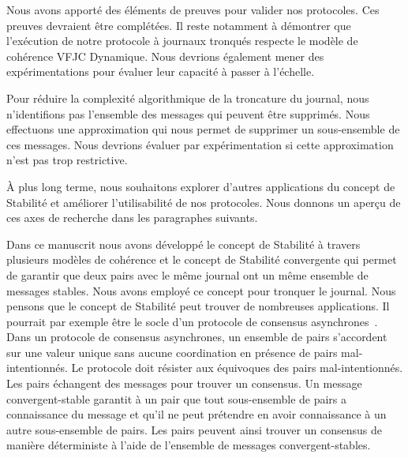 
Nous avons apporté des éléments de preuves pour valider nos protocoles.
Ces preuves devraient être complétées.
Il reste notamment à démontrer que l'exécution de notre protocole à journaux tronqués respecte le modèle de cohérence \acl{VFJC} Dynamique.
Nous devrions également mener des expérimentations pour évaluer leur capacité à passer à l'échelle.

Pour réduire la complexité algorithmique de la troncature du journal, nous n'identifions pas l'ensemble des messages qui peuvent être supprimés.
Nous effectuons une approximation qui nous permet de supprimer un sous-ensemble de ces messages.
Nous devrions évaluer par expérimentation si cette approximation n'est pas trop restrictive.

À plus long terme, nous souhaitons explorer d'autres applications du concept de Stabilité et améliorer l'utilisabilité de nos protocoles.
Nous donnons un aperçu de ces axes de recherche dans les paragraphes suivants.

Dans ce manuscrit nous avons développé le concept de Stabilité à travers plusieurs modèles de cohérence et le concept de Stabilité convergente qui permet de garantir que deux pairs avec le même journal ont un même ensemble de messages stables.
Nous avons employé ce concept pour tronquer le journal.
Nous pensons que le concept de Stabilité peut trouver de nombreuses applications.
Il pourrait par exemple être le socle d'un protocole de consensus asynchrones~\autocite{bracha1985asynchronous}.
Dans un protocole de consensus asynchrones, un ensemble de pairs s'accordent sur une valeur unique sans aucune coordination en présence de pairs mal-intentionnés.
Le protocole doit résister aux équivoques des pairs mal-intentionnés.
Les pairs échangent des messages pour trouver un consensus.
Un message convergent-stable garantit à un pair que tout sous-ensemble de pairs a connaissance du message et qu'il ne peut prétendre en avoir connaissance à un autre sous-ensemble de pairs.
Les pairs peuvent ainsi trouver un consensus de manière déterministe à l'aide de l'ensemble de messages convergent-stables.

